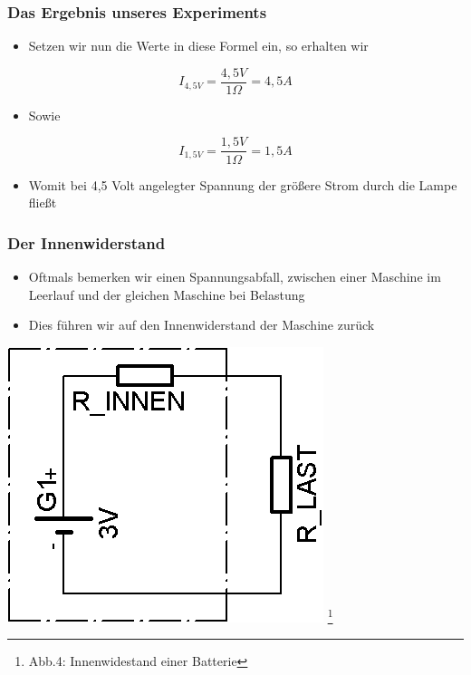 \begin{frame}
	\frametitle{Das Ergebnis unseres Experiments}
	\begin{itemize}
		\item	Setzen wir nun die Werte in diese Formel ein, so erhalten wir
	\end{itemize}
	\begin{equation}
		I_{4,5 V} = \frac{4,5 V}{1 \Omega} = 4,5 A
	\end{equation}
	\begin{itemize}
		\item Sowie
	\end{itemize}
	\begin{equation}
		I_{1,5 V} = \frac{1,5 V}{1 \Omega} = 1,5 A
	\end{equation}
	\begin{itemize}
		\item	Womit bei 4,5 Volt angelegter Spannung der größere Strom durch die Lampe fließt
	\end{itemize}
\end{frame}

\begin{frame}
	\frametitle{Der Innenwiderstand}
	\begin{itemize}
		\item	Oftmals bemerken wir einen Spannungsabfall, zwischen einer Maschine im Leerlauf und der gleichen Maschine bei Belastung
		\item	Dies führen wir auf den Innenwiderstand der Maschine zurück
	\end{itemize}
	\begin{center}
 		\includegraphics[scale=1.4]{e03/Innenwiderstand.png}
 		\footnote{Abb.4: Innenwidestand einer Batterie}
 	\end{center}
\end{frame}

